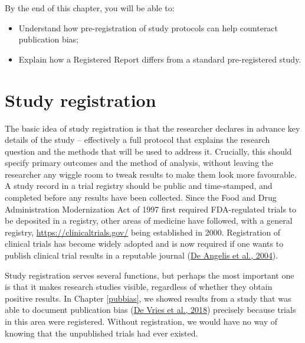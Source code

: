 \documentclass{krantz}
\begin{document}
By the end of this chapter, you will be able to:

\begin{itemize}
\item
  Understand how pre-registration of study protocols can help counteract publication bias;
\item
  Explain how a Registered Report differs from a standard pre-registered study.
\end{itemize}

\hypertarget{study-registration}{%
\section{Study registration}\label{study-registration}}

The basic idea of study registration is that the researcher declares in advance key details of the study -- effectively a full protocol that explains the research question and the methods that will be used to address it. Crucially, this should specify primary outcomes and the method of analysis, without leaving the researcher any wiggle room to tweak results to make them look more favourable. A study record in a trial registry should be public and time-stamped, and completed before any results have been collected. Since the Food and Drug Administration Modernization Act of 1997 first required FDA-regulated trials to be deposited in a registry, other areas of medicine have followed, with a general registry, \url{https://clinicaltrials.gov/} being established in 2000. Registration of clinical trials has become widely adopted and is now required if one wants to publish clinical trial results in a reputable journal (\protect\hyperlink{ref-deangelis2004}{De Angelis et al., 2004}).

Study registration serves several functions, but perhaps the most important one is that it makes research studies visible, regardless of whether they obtain positive results. In Chapter \ref{pubbias}, we showed results from a study that was able to document publication bias (\protect\hyperlink{ref-devries2018}{De Vries et al., 2018}) precisely because trials in this area were registered. Without registration, we would have no way of knowing that the unpublished trials had ever existed.
\end{document}
